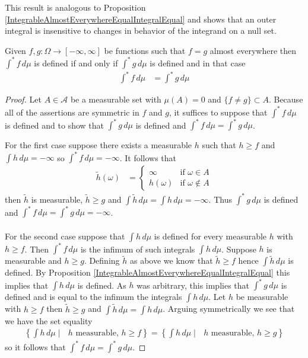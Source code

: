 This result is analogous to Proposition \ref{IntegrableAlmostEverywhereEqualIntegralEqual} and shows that an outer integral is insensitive to changes in behavior of the integrand on a null set.
\begin{prop}\label{OuterIntegralAlmostEverywhereEqualIntegralEqual}Given $f,g : \Omega \to [-\infty, \infty]$ be functions such that $f = g$ almost everywhere then $\int^* f \, d\mu$ is defined if and only if $\int^* g \, d\mu$ is defined and in that case
\begin{align*}
\int^* f \, d\mu &= \int^* g \, d\mu
\end{align*}
\end{prop}
\begin{proof}
Let $A \in \mathcal{A}$ be a measurable set with $\mu(A) = 0$ and $\lbrace f \neq g \rbrace \subset A$.  Because all of the assertions are symmetric in $f$ and $g$, it suffices to suppose that $\int^* f \, d\mu$ is defined and to show that $\int^* g \, d\mu$ is defined and $\int^* f \, d\mu=\int^* g \, d\mu$.

For the first case suppose there exists a measurable $h$ such that $h \geq f$ and $\int h \, d\mu=-\infty$ so $\int^* f \, d\mu =-\infty$.  It follows that 
\begin{align*}
\tilde{h}(\omega) &= \begin{cases}
\infty & \text{if $\omega \in A$} \\
h(\omega) & \text{if $\omega \notin A$}
\end{cases}
\end{align*}
then $\tilde{h}$ is measurable, $\tilde{h} \geq g$ and $\int \tilde{h} \, d\mu = \int h \, d\mu=-\infty$.  Thus $\int^* g \, d\mu$ is defined and $\int^*f \, d\mu = \int^* g \, d\mu = -\infty$.  
\begin{align*}
\end{align*}

For the second case suppose that $\int h \, d\mu$ is defined for every measurable $h$ with $h \geq f$.  Then $\int^* f \, d\mu$ is the infimum of such integrals $\int h \, d\mu$.  Suppose $h$ is measurable and $h \geq g$.  Defining $\tilde{h}$ as above we know that $\tilde{h} \geq f$ hence $\int \tilde{h} \, d\mu$ is defined.  By Proposition \ref{IntegrableAlmostEverywhereEqualIntegralEqual} this implies that $\int h \, d\mu$ is defined.  As $h$ was arbitrary, this implies that $\int^* g \, d\mu$ is defined and is equal to the infimum the integrals $\int h \, d\mu$.  Let $h$ be measurable with $h \geq f$ then $\tilde{h} \geq g$ and $\int \tilde{h} \, d\mu = \int h \, d\mu$.  Arguing symmetrically we see that we have the set equality 
\begin{align*}
\left \lbrace \int h  \, d\mu \mid \text{ $h$ measurable, } h \geq f \right \rbrace = \left \lbrace \int h  \, d\mu \mid \text{ $h$ measurable, } h \geq g \right \rbrace
\end{align*}
so it follows that $\int^* f \, d\mu = \int^* g \, d\mu$.
\end{proof}

